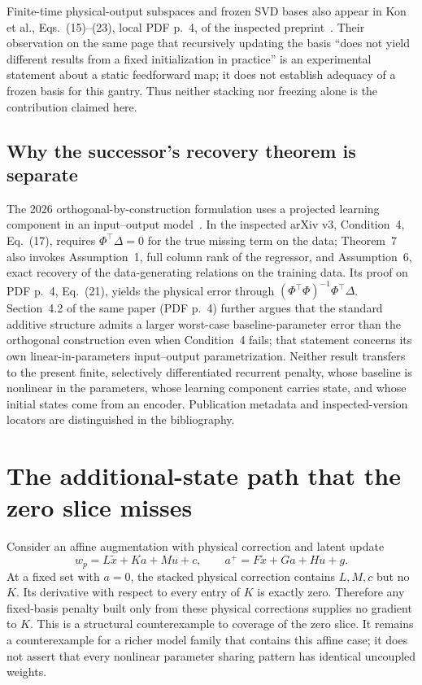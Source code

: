 \documentclass[11pt,a4paper]{article}
\theoremstyle{remark}
\begin{document}
Finite-time physical-output subspaces and frozen SVD bases also appear in Kon et al., Eqs.~(15)--(23), local PDF p.~4, of the inspected preprint~\cite{kon2023}. Their observation on the same page that recursively updating the basis ``does not yield different results from a fixed initialization in practice'' is an experimental statement about a static feedforward map; it does not establish adequacy of a frozen basis for this gantry. Thus neither stacking nor freezing alone is the contribution claimed here.

\subsection{Why the successor's recovery theorem is separate}
The 2026 orthogonal-by-construction formulation uses a projected learning component in an input--output model~\cite{gyorok2026}. In the inspected arXiv v3, Condition~4, Eq.~(17), requires $\Phi^\top\Delta=0$ for the true missing term on the data; Theorem~7 also invokes Assumption~1, full column rank of the regressor, and Assumption~6, exact recovery of the data-generating relations on the training data. Its proof on PDF p.~4, Eq.~(21), yields the physical error through $(\Phi^\top\Phi)^{-1}\Phi^\top\Delta$. Section~4.2 of the same paper (PDF p.~4) further argues that the standard additive structure admits a larger worst-case baseline-parameter error than the orthogonal construction even when Condition~4 fails; that statement concerns its own linear-in-parameters input--output parametrization. Neither result transfers to the present finite, selectively differentiated recurrent penalty, whose baseline is nonlinear in the parameters, whose learning component carries state, and whose initial states come from an encoder. Publication metadata and inspected-version locators are distinguished in the bibliography.

\section{The additional-state path that the zero slice misses}
Consider an affine augmentation with physical correction and latent update
\begin{equation}\label{eq:affine}
 w_p=L\tilde x+Ka+Mu+c,\qquad
 a^+=F\tilde x+Ga+Hu+g.
\end{equation}
At a fixed set with $a=0$, the stacked physical correction contains $L,M,c$ but no $K$. Its derivative with respect to every entry of $K$ is exactly zero. Therefore any fixed-basis penalty built only from these physical corrections supplies no gradient to $K$. This is a structural counterexample to coverage of the zero slice. It remains a counterexample for a richer model family that contains this affine case; it does not assert that every nonlinear parameter sharing pattern has identical uncoupled weights.
\end{document}
